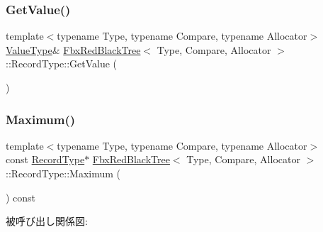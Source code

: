 \mbox{\label{class_fbx_red_black_tree_1_1_record_type_a7c5822c8b6c41757eaafe32e37cfbdb4}} 
\subsubsection{\texorpdfstring{Get\+Value()}{GetValue()}\hspace{0.1cm}{\footnotesize\ttfamily [2/2]}}
{\footnotesize\ttfamily template$<$typename Type, typename Compare, typename Allocator$>$ \\
\hyperlink{class_fbx_red_black_tree_a178e34888fa8c0fab5a7527ab30a663c}{Value\+Type}\& \hyperlink{class_fbx_red_black_tree}{Fbx\+Red\+Black\+Tree}$<$ Type, Compare, Allocator $>$\+::Record\+Type\+::\+Get\+Value (\begin{DoxyParamCaption}{ }\end{DoxyParamCaption})}

\mbox{\label{class_fbx_red_black_tree_1_1_record_type_a6749244cf93a46657d689bd51b67ed04}} 
\subsubsection{\texorpdfstring{Maximum()}{Maximum()}\hspace{0.1cm}{\footnotesize\ttfamily [1/2]}}
{\footnotesize\ttfamily template$<$typename Type, typename Compare, typename Allocator$>$ \\
const \hyperlink{class_fbx_red_black_tree_1_1_record_type}{Record\+Type}$\ast$ \hyperlink{class_fbx_red_black_tree}{Fbx\+Red\+Black\+Tree}$<$ Type, Compare, Allocator $>$\+::Record\+Type\+::\+Maximum (\begin{DoxyParamCaption}{ }\end{DoxyParamCaption}) const}

被呼び出し関係図\+:
\mbox{\label{class_fbx_red_black_tree_1_1_record_type_a6168efad3c4168277be9c9bea791d88f}} 
